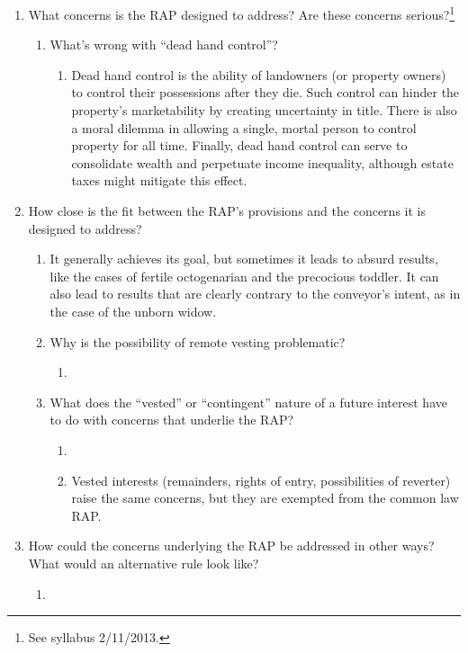 \begin{enumerate}
    \item What concerns is the RAP designed to address? Are these concerns 
    serious?\footnote{See syllabus 2/11/2013.}
    \begin{enumerate}
        \item What's wrong with ``dead hand control''?
        \begin{enumerate}
            \item Dead hand control is the ability of landowners (or property 
            owners) to control their possessions after they die. Such control 
            can hinder the property's marketability by creating uncertainty in 
            title. There is also a moral dilemma in allowing a single, mortal 
            person to control property for all time. Finally, dead hand 
            control can serve to consolidate wealth and perpetuate income 
            inequality, although estate taxes might mitigate this effect.
        \end{enumerate}
    \end{enumerate}
    \item How close is the fit between the RAP's provisions and the concerns 
    it is designed to address?
    \begin{enumerate}
        \item It generally achieves its goal, but sometimes it leads to absurd 
        results, like the cases of fertile octogenarian and the precocious 
        toddler. It can also lead to results that are clearly contrary to the 
        conveyor's intent, as in the case of the unborn widow.
        \item Why is the possibility of remote vesting problematic?
        \begin{enumerate}
            \item %
        \end{enumerate}
        \item What does the ``vested'' or ``contingent'' nature of a future 
        interest have to do with concerns that underlie the RAP?
        \begin{enumerate}
            \item %
            \item Vested interests (remainders, rights of entry, possibilities 
            of reverter) raise the same concerns, but they are exempted from 
            the common law RAP.
        \end{enumerate}
    \end{enumerate}
    \item How could the concerns underlying the RAP be addressed in other 
    ways? What would an alternative rule look like?
    \begin{enumerate}
        \item %
    \end{enumerate}
\end{enumerate}

